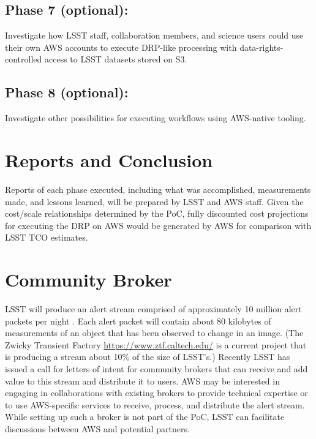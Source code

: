 \subsection{Phase 7 (optional):} \label{sec:phase-7}
Investigate how LSST staff, collaboration members, and science users could use their own AWS accounts to execute DRP-like processing with data-rights-controlled access to LSST datasets stored on S3.

\subsection{Phase 8 (optional):} \label{sec:phase-8}
Investigate other possibilities for executing workflows using AWS-native tooling.

\section{Reports and Conclusion} \label{sec:reports}
Reports of each phase executed, including what was accomplished, measurements made, and lessons learned, will be prepared by LSST and AWS staff. Given the cost/scale relationships determined by the PoC, fully discounted cost projections for executing the DRP on AWS would be generated by AWS for comparison with LSST TCO estimates.

\section{Community Broker} \label{sec:broker}
LSST will produce an alert stream comprised of approximately 10 million alert packets per night .
Each alert packet will contain about 80 kilobytes of measurements of an object that has been observed to change in an image.
(The Zwicky Transient Factory \href{ZTF}{https://www.ztf.caltech.edu/} is a current project that is producing a stream about 10\% of the size of LSST's.)
Recently LSST has issued a call for letters of intent for community brokers  that can receive and add value to this stream and distribute it to users.
AWS may be interested in engaging in collaborations with existing brokers to provide technical expertise or to use AWS-specific services to receive, process, and distribute the alert stream.
While setting up such a broker is not part of the PoC, LSST can facilitate discussions between AWS and potential partners.
